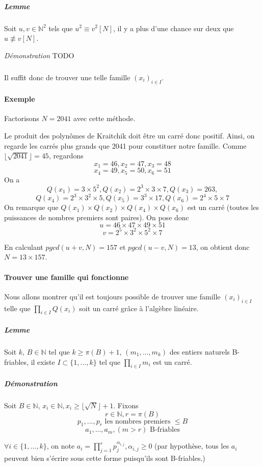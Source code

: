 \documentclass[11pt,a4paper]{article}
\begin{document}
	\subparagraph{Lemme} Soit $u, v \in \mathbb{N}^2$ tels que $u^2 \equiv v^2 [N]$, il y a plus d'une chance sur deux que $u \not\equiv v [N]$.	
	
	\textit{Démonstration} TODO
	
	\subparagraph{}
	Il suffit donc de trouver une telle famille $(x_i)_{i \in I}$.
	
	\paragraph{Exemple}
	Factorisons $N = 2041$ avec cette méthode.
	
	Le produit des polynômes de Kraitchik doit être un carré donc positif. Ainsi, on regarde les carrés plus grands que 2041 pour constituer notre famille.
	Comme $\lfloor \sqrt{2041} \rfloor = 45$, regardons 
	$$ x_1 = 46,  x_2 = 47, x_3 = 48$$ $$x_4 = 49, x_5 = 50, x_6 = 51$$
	On a 
	$$ Q(x_1) = 3 \times 5^2, Q(x_2) = 2^3 \times 3 \times 7, Q(x_3) = 263,$$
	$$ Q(x_4) = 2^3 \times 3^2 \times 5, Q(x_5) = 3^3 \times 17, Q(x_6) = 2^4 \times 5 \times 7$$
	On remarque que $Q(x_1) \times Q(x_2) \times Q(x_4) \times Q(x_6)$ est un carré (toutes les puissances de nombres premiers sont paires). On pose donc 
	$$u = 46 \times 47 \times 49 \times 51$$ $$v = 2^5 \times 3^2 \times 5^2 \times 7$$
	
	En calculant $pgcd(u+v, N) = 157$ et $pgcd(u-v, N) = 13$, on obtient donc $N = 13 \times 157$.
	
	\paragraph{Trouver une famille qui fonctionne}
	Nous allons montrer qu'il est toujours possible de trouver une famille $(x_i)_{i \in I}$ telle que $\prod_{i \in I} Q(x_i)$ soit un carré grâce à l'algèbre linéaire.

	\subparagraph{Lemme}
		Soit $k$, $B \in \mathbb{N}$ tel que $k \ge \pi(B) + 1$, $(m_1, ..., m_k)$ des entiers naturels B-friables,
		il existe $I \subset \{1, ..., k\}$ tel que $\prod_{i \in I} m_i$ est un carré.
		
	\subparagraph{Démonstration}
	Soit $B \in \mathbb{N}$, $x_i \in \mathbb{N}, x_i \ge \lfloor \sqrt{N} \rfloor +1$. Fixons 
	$$r \in \mathbb{N}, r = \pi(B)$$
	$$p_1, ..., p_r \text{ les nombres premiers } \le B$$
	$$a_1, ..., a_m , (m>r) \text{ B-friables}$$
	
	$\forall i \in \{1, ..., k\}$, on note $a_i = \prod_{j=1}^r p_j^{\alpha_{i,j}}, \alpha_{i,j} \ge 0$ (par hypothèse, tous les $a_i$ peuvent bien s'écrire sous cette forme puisqu'ils sont B-friables.)
	
\end{document}
